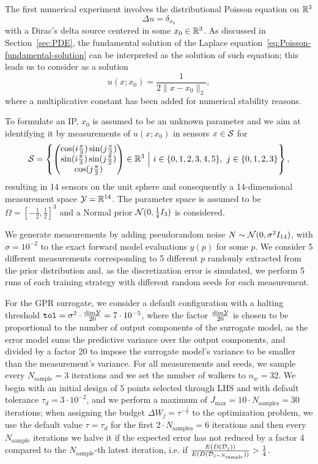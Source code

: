 The first numerical experiment involves the distributional Poisson equation on $\mathbb{R}^3$
\[
 \Delta u = \delta_{x_0}
\] 
with a Dirac's delta source centered in some $x_0 \in \mathbb{R}^3$.
As discussed in Section~\ref{sec:PDE}, the fundamental solution of the Laplace equation~\eqref{eq:Poisson-fundamental-solution} can be interpreted as the solution of such equation; this leads us to consider as a solution
\[
u(x; x_0) =  \frac{1}{2 \|x-x_0\|_2},
\]
where a multiplicative constant has been added for numerical stability reasons. \medskip

To formulate an IP, $x_0$ is assumed to be an unknown parameter and we aim at identifying it by measurements of $u(x;x_0)$ in sensors $x \in \mathcal S$ for 
\[
    \mathcal S = \left\{
        \begin{pmatrix}
            \cos( i \frac{\pi}{3}) \sin( j \frac{\pi}{2}) \\
            \sin( i \frac{\pi}{3}) \sin( j \frac{\pi}{2}) \\ 
            \cos( j \frac{\pi}{2})
        \end{pmatrix} 
        \in \mathbb{R}^3 \ \Big| \ i \in \{0,1,2,3,4,5\}, \ j \in \{0,1,2,3\}
     \right\},
\]
resulting in 14 sensors on the unit sphere and consequently a 14-dimensional measurement space $\mathcal Y = \mathbb{R}^{14}$. \newline
The parameter space is assumed to be $\Omega = \left[-\frac{1}{2}, \frac{1}{2}\right]^3$ and a Normal prior $\mathcal N (0, \frac{1}{4}I_3)$ is considered.

We generate measurements by adding pseudorandom noise $N \sim \mathcal N (0, \sigma^2 I_{14})$, with $\sigma = 10^{-2}$ to the exact forward model evaluations $y(p)$ for some $p$. 
We consider 5 different measurements corresponding to 5 different $p$ randomly extracted from the prior distribution and, as the discretization error is simulated, we perform 5 runs of each training strategy with different random seeds for each measurement.
\medskip

For the GPR surrogate, we consider a default configuration with a halting threshold $\texttt{tol} = \sigma^2 \cdot \frac{\text{dim} \mathcal Y }{20} = 7\cdot 10^{-5}$, where the factor $\frac{\text{dim} \mathcal Y}{20}$ is chosen to be proportional to the number of output components of the surrogate model, as the error model sums the predictive variance over the output components, and divided by a factor 20 to impose the surrogate model's variance to be smaller than the measurement's variance.
For all measurements and seeds, we sample every $N_{\text{sample}} = 3$ iterations and we set the number of walkers to $n_w = 32$.
We begin with an initial design of $5$ points selected through LHS and with default tolerance $\tau_d = 3 \cdot 10^{-2}$, and we perform a maximum of $J_{\max} = 10 \cdot N_{\text{samples}} = 30$ iterations; when assigning the budget $\Delta W_j = \tau ^{-\frac{l}{r}}$ to the optimization problem, we use the default value $\tau= \tau_d$ for the first $2\cdot N_{\text{samples}} = 6$ iterations and then every $N_{\text{sample}}$ iterations we halve it if the expected error has not reduced by a factor 4 compared to the $N_{\text{sample}}$-th latest iteration, i.e. if $\frac{E(D(\mathcal D_j))}{E(D(\mathcal D_{j-N_{\text{sample}}}))} > \frac{1}{4}$.

